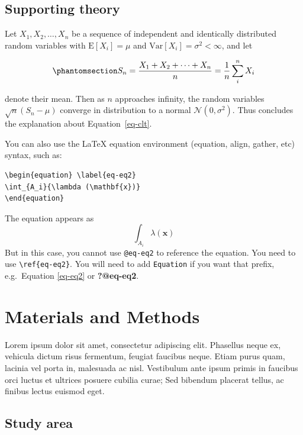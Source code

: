 \documentclass[
  oneside,
  open=any]{scrbook}
\begin{document}
\section{Supporting theory}\label{supporting-theory}

Let \(X_1, X_2, \ldots, X_n\) be a sequence of independent and
identically distributed random variables with \(\text{E}[X_i] = \mu\)
and \(\text{Var}[X_i] = \sigma^2 < \infty\), and let

\begin{equation}\phantomsection\label{eq-clt}{
S_n = \frac{X_1 + X_2 + \cdots + X_n}{n}
      = \frac{1}{n}\sum_{i}^{n} X_i
}\end{equation}

denote their mean. Then as \(n\) approaches infinity, the random
variables \(\sqrt{n}(S_n - \mu)\) converge in distribution to a normal
\(\mathcal{N}(0, \sigma^2)\). Thus concludes the explanation about
Equation~\ref{eq-clt}.

You can also use the LaTeX equation environment (equation, align,
gather, etc) syntax, such as:

\begin{verbatim}
\begin{equation} \label{eq-eq2}
\int_{A_i}{\lambda (\mathbf{x})}
\end{equation} 
\end{verbatim}

The equation appears as \begin{equation} \label{eq-eq2}
\int_{A_i}{\lambda (\mathbf{x})}
\end{equation} But in this case, you cannot use \texttt{@eq-eq2} to
reference the equation. You need to use
\texttt{\textbackslash{}ref\{eq-eq2\}}. You will need to add
\texttt{Equation} if you want that prefix, e.g.~Equation \ref{eq-eq2} or
\textbf{?@eq-eq2}.

\chapter{Materials and Methods}\label{materials-and-methods}

Lorem ipsum dolor sit amet, consectetur adipiscing elit. Phasellus neque
ex, vehicula dictum risus fermentum, feugiat faucibus neque. Etiam purus
quam, lacinia vel porta in, malesuada ac nisl. Vestibulum ante ipsum
primis in faucibus orci luctus et ultrices posuere cubilia curae; Sed
bibendum placerat tellus, ac finibus lectus euismod eget.

\section{Study area}\label{study-area}
\end{document}
